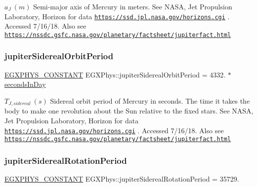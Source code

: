 $ a_{J} \ (m)$ Semi-\/major axis of Mercury in meters. See N\+A\+SA, Jet Propulsion Laboratory, Horizon for data \href{https://ssd.jpl.nasa.gov/horizons.cgi}{\tt https\+://ssd.\+jpl.\+nasa.\+gov/horizons.\+cgi} . Accessed 7/16/18. Also see \href{https://nssdc.gsfc.nasa.gov/planetary/factsheet/jupiterfact.html}{\tt https\+://nssdc.\+gsfc.\+nasa.\+gov/planetary/factsheet/jupiterfact.\+html} \mbox{\label{group___e_g_x_phys-_constants-_astrophysics-_solar_system-_jupiter-_orbit_ga96e12fb8636fcff0c503d7765bc1e192}} 
\subsubsection{\texorpdfstring{jupiter\+Sidereal\+Orbit\+Period}{jupiterSiderealOrbitPeriod}}
{\footnotesize\ttfamily \mbox{\hyperlink{group___e_g_x_phys-_constants-_macros_ga76980d288494ce1714c9ac68a95ba702}{E\+G\+X\+P\+H\+Y\+S\+\_\+\+C\+O\+N\+S\+T\+A\+NT}} E\+G\+X\+Phys\+::jupiter\+Sidereal\+Orbit\+Period = 4332. $\ast$ \mbox{\hyperlink{namespace_e_g_x_phys_a93d2a00d75411b58cbf63ab3fd1f8bc2}{seconds\+In\+Day}}}

$ T_{J,sidereal} \ (s)$ Sidereal orbit period of Mercury in seconds. The time it takes the body to make one revolution about the Sun relative to the fixed stars. See N\+A\+SA, Jet Propulsion Laboratory, Horizon for data \href{https://ssd.jpl.nasa.gov/horizons.cgi}{\tt https\+://ssd.\+jpl.\+nasa.\+gov/horizons.\+cgi} . Accessed 7/16/18. Also see \href{https://nssdc.gsfc.nasa.gov/planetary/factsheet/jupiterfact.html}{\tt https\+://nssdc.\+gsfc.\+nasa.\+gov/planetary/factsheet/jupiterfact.\+html} \mbox{\label{group___e_g_x_phys-_constants-_astrophysics-_solar_system-_jupiter-_orbit_gadcd54280d32940fa38030456c9978303}} 
\subsubsection{\texorpdfstring{jupiter\+Sidereal\+Rotation\+Period}{jupiterSiderealRotationPeriod}}
{\footnotesize\ttfamily \mbox{\hyperlink{group___e_g_x_phys-_constants-_macros_ga76980d288494ce1714c9ac68a95ba702}{E\+G\+X\+P\+H\+Y\+S\+\_\+\+C\+O\+N\+S\+T\+A\+NT}} E\+G\+X\+Phys\+::jupiter\+Sidereal\+Rotation\+Period = 35729.}

